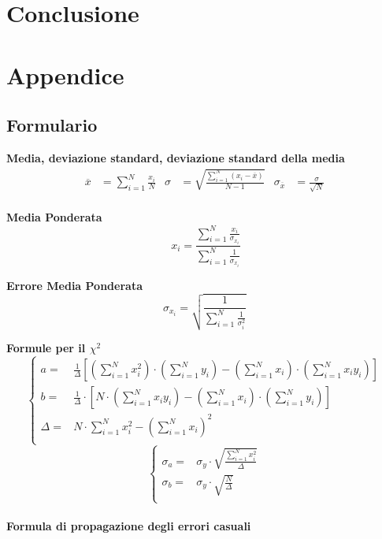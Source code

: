 \documentclass[a4paper,11pt,oneside]{article}
\begin{document}
\section{Conclusione}

\section{Appendice}

\subsection{Formulario}
\textbf{Media, deviazione standard, deviazione standard della media}
\begin{align*}
        \overline{x}&=\sum\limits_{i=1}^{N} \frac{x_{i}}{N}&
        \sigma&=\sqrt{\frac{\sum\limits_{i=1}^{N} (x_{i}-\overline{x})}{N-1}}&
        \sigma_{\overline{x}}&=\frac{\sigma}{\sqrt{N}}
\end{align*}\\

\textbf{Media Ponderata}
\begin{equation*}\
    x_i=\frac{\sum_{i=1}^{N}\frac{x_i}{\sigma_{x_i}}}{\sum_{i=1}^{N}\frac{1}{\sigma_{x_i}}} \label{eq:media_ponderata}
\end{equation*}

\textbf{Errore Media Ponderata}
\begin{equation*}
     \sigma_{x_i}=\sqrt{\frac{1}{\sum_{i=1}^{N}\frac{1}{\sigma_{i}^{2}}}}\label{eq:errore_media_pond}
\end{equation*}

\textbf{Formule per il ${\chi}^2$}
\begin{equation*}
        \begin{cases}
    a=&\frac{1}{\Delta}[(\sum\limits_{i=1}^{N}{x_{i}^{2}})\cdot(\sum\limits_{i=1}^{N}{y_{i}})-(\sum\limits_{i=1}^{N}{x_{i}})\cdot(\sum\limits_{i=1}^{N}{x_{i}y_{i}})] \\ 
    b=&\frac{1}{\Delta }\cdot \left [N\cdot \left ( \sum\limits_{i=1}^{N}x_i y_i \right )-\left ( \sum\limits_{i=1}^{N}x_i \right )\cdot \left ( \sum\limits_{i=1}^{N}y_i \right )  \right ]\\
    \Delta=& N\cdot \sum\limits_{i=1}^{N} x_i^{2} - \left ( \sum\limits_{i=1}^{N}x_i \right )^{2}\\
    \end{cases}
\end{equation*}
\begin{equation*}
    \begin{cases}
    \sigma_{a}=&\sigma_{y}\cdot\sqrt{\frac{\sum_{i=1}^{N}{x_{i}^{2}}}{\Delta}} \\
    \sigma_{b}=&\sigma_y\cdot \sqrt{\frac{N}{\Delta }}\\
    \end{cases}
    \label{equation:err_chi_quadro}
\end{equation*}
\\
\textbf{Formula di propagazione degli errori casuali}\\
\end{document}
